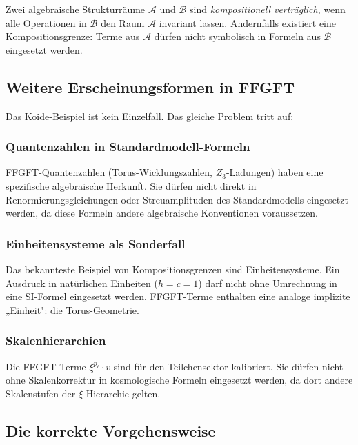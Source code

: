 \begin{foundation}[Kompositionsgrenze]
Zwei algebraische Strukturräume $\mathcal{A}$ und $\mathcal{B}$ sind
\emph{kompositionell verträglich}, wenn alle Operationen in $\mathcal{B}$
den Raum $\mathcal{A}$ invariant lassen. Andernfalls existiert eine
Kompositionsgrenze: Terme aus $\mathcal{A}$ dürfen nicht symbolisch
in Formeln aus $\mathcal{B}$ eingesetzt werden.
\end{foundation}

\subsection{Weitere Erscheinungsformen in FFGFT}

Das Koide-Beispiel ist kein Einzelfall. Das gleiche Problem tritt auf:

\subsubsection*{Quantenzahlen in Standardmodell-Formeln}

FFGFT-Quantenzahlen (Torus-Wicklungszahlen, $Z_3$-Ladungen) haben eine
spezifische algebraische Herkunft. Sie dürfen nicht direkt in
Renormierungsgleichungen oder Streuamplituden des Standardmodells
eingesetzt werden, da diese Formeln andere algebraische Konventionen
voraussetzen.

\subsubsection*{Einheitensysteme als Sonderfall}

Das bekannteste Beispiel von Kompositionsgrenzen sind Einheitensysteme.
Ein Ausdruck in natürlichen Einheiten ($\hbar = c = 1$) darf nicht
ohne Umrechnung in eine SI-Formel eingesetzt werden. FFGFT-Terme
enthalten eine analoge implizite „Einheit": die Torus-Geometrie.

\subsubsection*{Skalenhierarchien}

Die FFGFT-Terme $\xi^{p_\ell} \cdot v$ sind für den Teilchensektor
kalibriert. Sie dürfen nicht ohne Skalenkorrektur in kosmologische
Formeln eingesetzt werden, da dort andere Skalenstufen der $\xi$-Hierarchie
gelten.

\subsection{Die korrekte Vorgehensweise}

